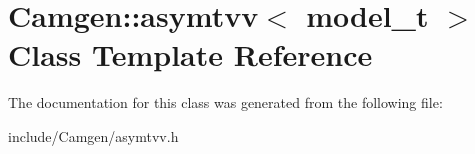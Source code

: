 \hypertarget{a00018}{\section{Camgen\-:\-:asymtvv$<$ model\-\_\-t $>$ Class Template Reference}
\label{a00018}
}


The documentation for this class was generated from the following file\-:\begin{DoxyCompactItemize}
\item 
include/\-Camgen/asymtvv.\-h\end{DoxyCompactItemize}
